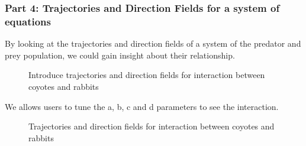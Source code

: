 \documentclass{article}
\begin{document}
\begin{normalsize}
		\subsubsection{Part 4: Trajectories and Direction Fields for a system of equations}
		By looking at the trajectories and direction fields of a system of the predator and prey population, we could gain insight about their relationship.
		\begin{figure}[H]
		\caption{Introduce trajectories and direction fields for interaction between coyotes and rabbits}
		\end{figure}
	We allows users to tune the a, b, c and d parameters to see the interaction. 
		\begin{figure}[H]
		\caption{Trajectories and direction fields for interaction between coyotes and rabbits}
		\end{figure}	

\end{normalsize}
\end{document}
